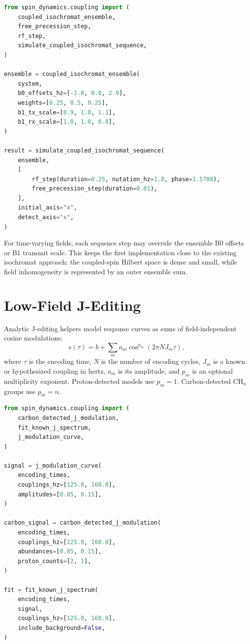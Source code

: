\documentclass[11pt,oneside]{report}
\begin{document}
\begin{lstlisting}[language=Python]
from spin_dynamics.coupling import (
    coupled_isochromat_ensemble,
    free_precession_step,
    rf_step,
    simulate_coupled_isochromat_sequence,
)

ensemble = coupled_isochromat_ensemble(
    system,
    b0_offsets_hz=[-2.0, 0.0, 2.0],
    weights=[0.25, 0.5, 0.25],
    b1_tx_scale=[0.9, 1.0, 1.1],
    b1_rx_scale=[1.0, 1.0, 0.8],
)

result = simulate_coupled_isochromat_sequence(
    ensemble,
    [
        rf_step(duration=0.25, nutation_hz=1.0, phase=1.5708),
        free_precession_step(duration=0.01),
    ],
    initial_axis="x",
    detect_axis="x",
)
\end{lstlisting}

For time-varying fields, each sequence step may override the ensemble B0
offsets or B1 transmit scale. This keeps the first implementation close to the
existing isochromat approach: the coupled-spin Hilbert space is dense and small,
while field inhomogeneity is represented by an outer ensemble sum.

\section{Low-Field J-Editing}

Analytic J-editing helpers model response curves as sums of field-independent
cosine modulations:
\[
  s(\tau) =
    b + \sum_m a_m
      \cos^{p_m}\!\left(2\pi N J_m \tau\right),
\]
where \(\tau\) is the encoding time, \(N\) is the number of encoding cycles,
\(J_m\) is a known or hypothesized coupling in hertz, \(a_m\) is its amplitude,
and \(p_m\) is an optional multiplicity exponent. Proton-detected models use
\(p_m=1\). Carbon-detected \(\mathrm{CH}_n\) groups use \(p_m=n\).

\begin{lstlisting}[language=Python]
from spin_dynamics.coupling import (
    carbon_detected_j_modulation,
    fit_known_j_spectrum,
    j_modulation_curve,
)

signal = j_modulation_curve(
    encoding_times,
    couplings_hz=[125.0, 160.0],
    amplitudes=[0.85, 0.15],
)

carbon_signal = carbon_detected_j_modulation(
    encoding_times,
    couplings_hz=[125.0, 160.0],
    abundances=[0.85, 0.15],
    proton_counts=[2, 1],
)

fit = fit_known_j_spectrum(
    encoding_times,
    signal,
    couplings_hz=[125.0, 160.0],
    include_background=False,
)
\end{lstlisting}
\end{document}
